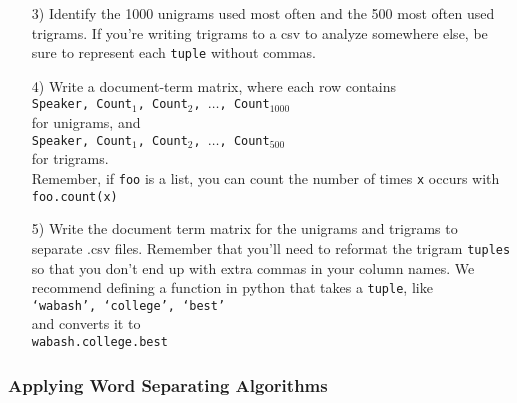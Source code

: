 \documentclass[12pt,letterpaper]{article}
\begin{document}
\begin{itemize}
\item[3)] Identify the 1000 unigrams used most often and the 500 most often used trigrams.  If you're writing trigrams to a csv to analyze somewhere else, be sure to represent each {\tt tuple} without commas.  
\item[4)] Write a document-term matrix, where each row contains \\
{\tt Speaker, Count$_1$, Count$_2$, $\hdots$, Count$_{1000}$ }\\
for unigrams, and \\
{\tt Speaker, Count$_1$, Count$_2$, $\hdots$, Count$_{500}$ }\\
for trigrams. \\

Remember, if {\tt foo} is a list, you can count the number of times {\tt x} occurs with \\
{\tt foo.count(x)}

\item[5)] Write the document term matrix for the unigrams and trigrams to separate .csv files.  Remember that you'll need to reformat the trigram {\tt tuples} so that you don't end up with extra commas in your column names. We recommend defining a function in python that takes a {\tt tuple}, like \\
{\tt `wabash', `college', `best'} \\
and converts it to\\
{\tt wabash.college.best}
\end{itemize}



\subsubsection*{Applying Word Separating Algorithms}
\end{document}
